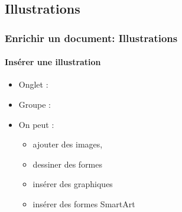 \documentclass[xcolor=table]{beamer}
\begin{document}
\subsection{Illustrations}

\begin{frame}[t]
\frametitle{Enrichir un document: Illustrations}
\framesubtitle{Insérer une illustration}

\begin{minipage}{0.43\textwidth}
\begin{itemize}
	\item Onglet : 
	\item Groupe : 
	\item On peut :
	\begin{itemize}
		\item ajouter des images,
		\item dessiner des formes
		\item insérer des graphiques
		\item insérer des formes SmartArt
	\end{itemize}
\end{itemize}
\end{minipage}
\begin{minipage}{0.28\textwidth}
	
	
\end{minipage}
\begin{minipage}{0.27\textwidth}	
\end{minipage}

\end{frame}
\end{document}
